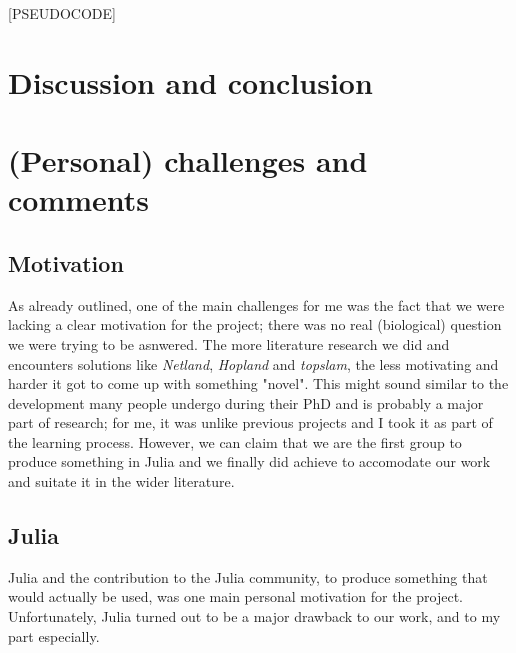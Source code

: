 \documentclass[journal, a4paper]{IEEEtran}
\begin{document}
[PSEUDOCODE]

\section{Discussion and conclusion}



\section{(Personal) challenges and comments}


\subsection{Motivation}
As already outlined, one of the main challenges for me was the fact that we were lacking a clear motivation for the project; there was no real (biological) question we were trying to be asnwered. The more literature research we did and encounters solutions like \textit{Netland}, \textit{Hopland} and \textit{topslam}, the less motivating and harder it got to come up with something "novel". This might sound similar to the development many people undergo during their PhD and is probably a major part of research; for me, it was unlike previous projects and I took it as part of the learning process.
However, we can claim that we are the first group to produce something in Julia and we finally did achieve to accomodate our work and suitate it in the wider literature. 

\subsection{Julia}
Julia and the contribution to the Julia community, to produce something that would actually be used, was one main personal motivation for the project. Unfortunately, Julia turned out to be a major drawback to our work, and to my part especially.
\end{document}
